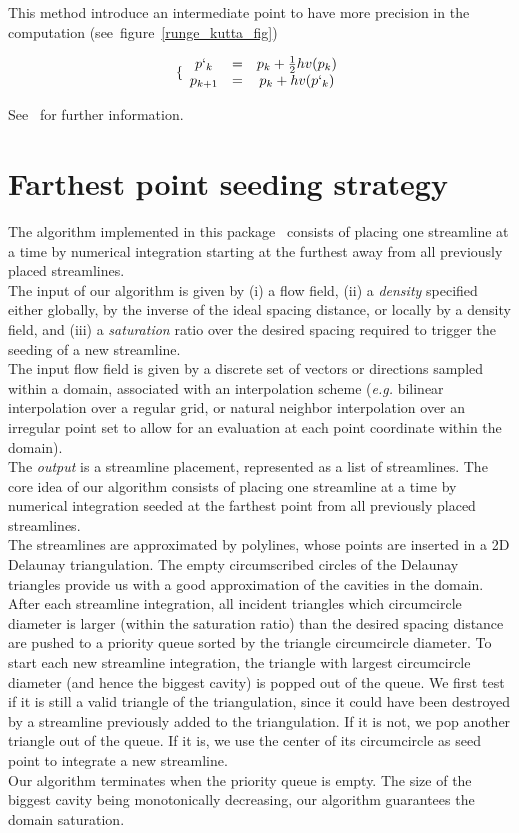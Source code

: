 This method introduce an intermediate point  to have more precision in the computation (see~figure~\ref{runge_kutta_fig})

$$\{ \begin{array}{ccc} p`_k & = & p_k + \frac{1}{2}hv(p_k) \\ p_{k+1} & = & p_k + hv(p`_k) \end{array}$$

See~\cite{cgal:ptvf-nrcpp-02} for further information.


\section{Farthest point seeding strategy}
\label{Section_2D_Streamlines_Strategy}
The algorithm implemented in this package~\cite{cgal:mad-fpsep-05} consists of
placing one streamline at
a time by numerical integration starting at the furthest away from all
previously placed streamlines.\\The input of our algorithm is given by
(i) a flow field, (ii) a \textit{density} specified either globally, by the
inverse of the ideal spacing distance, or locally by a density field, and (iii)
a \textit{saturation} ratio over the desired spacing required to trigger the
seeding of a new streamline.\\The input flow field is given by a discrete set of
vectors or directions sampled within a domain, associated with an interpolation
scheme (\textit{e.g.} bilinear interpolation over a regular grid, or natural
neighbor interpolation over an irregular point set to
allow for an evaluation at each point coordinate within the domain).\\The
\textit{output} is a streamline placement, represented as a list of streamlines.
The core idea of our algorithm consists of placing one streamline at a time by
numerical integration seeded at the farthest point from all previously placed
streamlines.\\The streamlines are approximated by polylines, whose points are
inserted in a 2D Delaunay triangulation. The empty circumscribed circles of the
Delaunay triangles provide us with a good approximation of the cavities in the
domain.\\After each streamline integration, all incident triangles which
circumcircle diameter is larger (within the saturation ratio) than the desired
spacing distance are pushed to a priority queue sorted by the triangle
circumcircle diameter. To start each new streamline integration, the triangle
with largest circumcircle diameter (and hence the biggest cavity) is popped out
of the queue. We first test if it is still a valid triangle of the
triangulation, since it could have been destroyed by a streamline previously
added to the triangulation. If it is not, we pop another triangle out of the
queue. If it is, we use the center of its circumcircle as seed point to
integrate a new streamline.\\Our algorithm terminates when the priority queue is empty. The size
of the biggest cavity being monotonically decreasing, our algorithm guarantees
the domain saturation.

